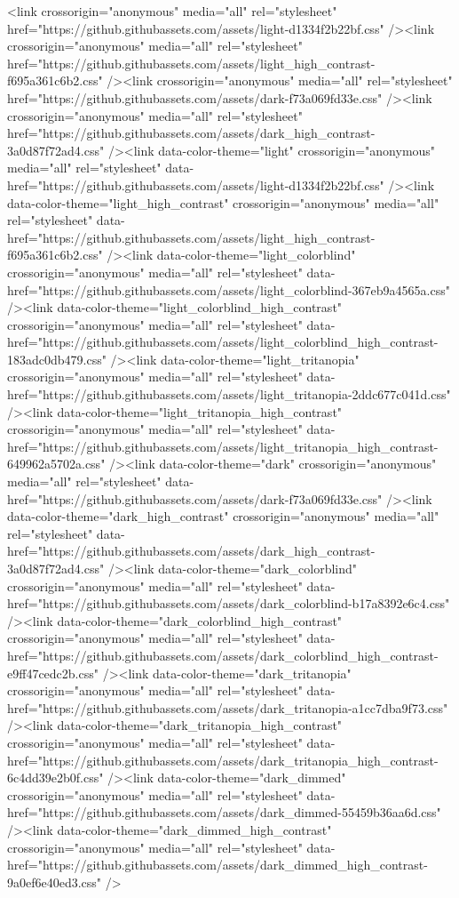   <link crossorigin="anonymous" media="all" rel="stylesheet" href="https://github.githubassets.com/assets/light-d1334f2b22bf.css" /><link crossorigin="anonymous" media="all" rel="stylesheet" href="https://github.githubassets.com/assets/light_high_contrast-f695a361c6b2.css" /><link crossorigin="anonymous" media="all" rel="stylesheet" href="https://github.githubassets.com/assets/dark-f73a069fd33e.css" /><link crossorigin="anonymous" media="all" rel="stylesheet" href="https://github.githubassets.com/assets/dark_high_contrast-3a0d87f72ad4.css" /><link data-color-theme="light" crossorigin="anonymous" media="all" rel="stylesheet" data-href="https://github.githubassets.com/assets/light-d1334f2b22bf.css" /><link data-color-theme="light_high_contrast" crossorigin="anonymous" media="all" rel="stylesheet" data-href="https://github.githubassets.com/assets/light_high_contrast-f695a361c6b2.css" /><link data-color-theme="light_colorblind" crossorigin="anonymous" media="all" rel="stylesheet" data-href="https://github.githubassets.com/assets/light_colorblind-367eb9a4565a.css" /><link data-color-theme="light_colorblind_high_contrast" crossorigin="anonymous" media="all" rel="stylesheet" data-href="https://github.githubassets.com/assets/light_colorblind_high_contrast-183adc0db479.css" /><link data-color-theme="light_tritanopia" crossorigin="anonymous" media="all" rel="stylesheet" data-href="https://github.githubassets.com/assets/light_tritanopia-2ddc677c041d.css" /><link data-color-theme="light_tritanopia_high_contrast" crossorigin="anonymous" media="all" rel="stylesheet" data-href="https://github.githubassets.com/assets/light_tritanopia_high_contrast-649962a5702a.css" /><link data-color-theme="dark" crossorigin="anonymous" media="all" rel="stylesheet" data-href="https://github.githubassets.com/assets/dark-f73a069fd33e.css" /><link data-color-theme="dark_high_contrast" crossorigin="anonymous" media="all" rel="stylesheet" data-href="https://github.githubassets.com/assets/dark_high_contrast-3a0d87f72ad4.css" /><link data-color-theme="dark_colorblind" crossorigin="anonymous" media="all" rel="stylesheet" data-href="https://github.githubassets.com/assets/dark_colorblind-b17a8392e6c4.css" /><link data-color-theme="dark_colorblind_high_contrast" crossorigin="anonymous" media="all" rel="stylesheet" data-href="https://github.githubassets.com/assets/dark_colorblind_high_contrast-e9ff47cedc2b.css" /><link data-color-theme="dark_tritanopia" crossorigin="anonymous" media="all" rel="stylesheet" data-href="https://github.githubassets.com/assets/dark_tritanopia-a1cc7dba9f73.css" /><link data-color-theme="dark_tritanopia_high_contrast" crossorigin="anonymous" media="all" rel="stylesheet" data-href="https://github.githubassets.com/assets/dark_tritanopia_high_contrast-6c4dd39e2b0f.css" /><link data-color-theme="dark_dimmed" crossorigin="anonymous" media="all" rel="stylesheet" data-href="https://github.githubassets.com/assets/dark_dimmed-55459b36aa6d.css" /><link data-color-theme="dark_dimmed_high_contrast" crossorigin="anonymous" media="all" rel="stylesheet" data-href="https://github.githubassets.com/assets/dark_dimmed_high_contrast-9a0ef6e40ed3.css" />


